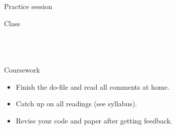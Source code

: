 \documentclass[t]{beamer}
\begin{document}
	\begin{frame}[t]{Practice session}

    \begin{block}{Class}
      \\
      \\
      
			\\
			\\    
    \end{block}

    \begin{alertblock}{Coursework}
      \begin{itemize}
	       \item Finish the do-file and read all comments at home.
	       \item Catch up on all readings %
				 	(see syllabus).
	       \item Revise your code and paper after getting feedback.
      \end{itemize}
    \end{alertblock}
    		
	\end{frame}
	
\end{document}
